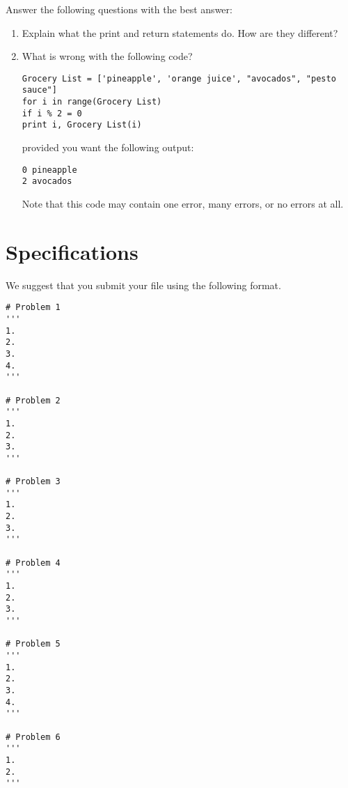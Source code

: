 \begin{problem}
Answer the following questions with the best answer:

\begin{enumerate}
\item Explain what the print and return statements do. How are they different?
\item What is wrong with the following code?
\begin{lstlisting}
Grocery List = ['pineapple', 'orange juice', "avocados", "pesto sauce"]
for i in range(Grocery List)
if i % 2 = 0
print i, Grocery List(i)
\end{lstlisting}
provided you want the following output:
\begin{lstlisting}
0 pineapple
2 avocados
\end{lstlisting}
Note that this code may contain one error, many errors, or no errors at all.

\end{enumerate}
\end{problem}



\section*{Specifications}
We suggest that you submit your  file using the following format.
\begin{lstlisting}
# Problem 1
'''
1. 
2. 
3. 
4.  
'''

# Problem 2	
'''
1. 
2.
3.  
'''

# Problem 3
'''	
1.
2.
3.
'''

# Problem 4
'''
1. 
2. 
3. 
'''

# Problem 5
'''
1. 
2. 
3.
4.  
'''

# Problem 6
'''
1. 
2.  
'''
\end{lstlisting}	

